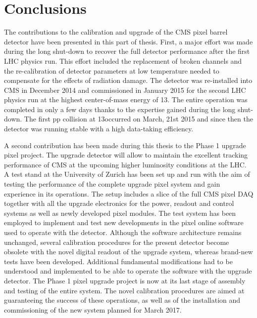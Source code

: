 \chapter{Conclusions}

The contributions to the calibration and upgrade of the CMS pixel barrel detector have been presented in this part of thesis.
First, a major effort was made during the long shut-down to recover the full detector performance after the first LHC physics run.
This effort included the replacement of broken channels and the re-calibration of detector parameters at low temperature needed to compensate for the effects of radiation damage.
The detector was re-installed into CMS in December 2014 and commissioned in January 2015 for the second LHC physics run at the highest center-of-mass energy of 13\TeV.
The entire operation was completed in only a few days thanks to the expertise gained during the long shut-down.
The first pp collision at 13\TeV occurred on March, 21st 2015 and since then the detector
was running stable with a high data-taking efficiency.

A second contribution has been made during this thesis to the Phase 1 upgrade pixel project.
The upgrade detector will allow to maintain the excellent tracking performance of CMS at the upcoming higher luminosity conditions at the LHC.
A test stand at the University of Zurich has been set up and run with the aim of testing the performance of the complete upgrade pixel system and gain experience in its operations.
The setup includes a slice of the full CMS pixel DAQ together with all the upgrade electronics for the power, readout and control systems as well as newly developed pixel modules.
The test system has been employed to implement and test new developments in the pixel online software used to operate with the detector.
Although the software architecture remains unchanged, several calibration procedures for the present detector become obsolete with the novel digital readout of the upgrade system,
whereas brand-new tests have been developed. 
Additional fundamental modifications had to be understood and implemented to be able to operate the software with the upgrade detector.
The Phase 1 pixel upgrade project is now at its last stage of assembly and testing of the entire system.
The novel calibration procedures are aimed at guaranteeing the success of these operations, as well as of the installation and commissioning of the new system planned for March 2017.